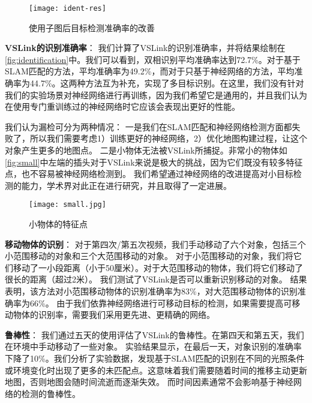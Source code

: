 \begin{figure*}[htbp]
	\centering
	\texttt{[image: ident-res]}
	\caption{使用子图后目标检测准确率的改善}
	\label{fig:identification}
\end{figure*}

\textbf{VSLink的识别准确率}：
我们计算了VSLink的识别准确率，并将结果绘制在\autoref{fig:identification}中。我们可以看到，双相识别平均准确率达到72.7\%。对于基于SLAM匹配的方法，平均准确率为49.2\%，而对于只基于神经网络的方法，平均准确率为44.7\%。这两种方法互为补充，实现了多目标识别。在这里，我们没有针对我们的实验场景对神经网络进行再训练，因为我们希望它是通用的，并且我们认为在使用专门重训练过的神经网络时它应该会表现出更好的性能。

我们认为漏检可分为两种情况：
一是我们在SLAM匹配和神经网络检测方面都失败了，所以我们需要考虑1）训练更好的神经网络，2）优化地图构建过程，让这个对象产生更多的地图点。
二是小物体无法被VSLink所捕捉。非常小的物体如\autoref{fig:small}中左端的插头对于VSLink来说是极大的挑战，因为它们既没有较多特征点，也不容易被神经网络检测到。
我们希望通过神经网络的改进提高对小目标检测的能力，学术界对此正在进行研究，并且取得了一定进展。
\begin{figure}[htbp]
	\centering
	\texttt{[image: small.jpg]}
	\caption{小物体的特征点}
	\label{fig:small}
\end{figure}

\textbf{移动物体的识别}：
对于第四次/第五次视频，我们手动移动了六个对象，包括三个小范围移动的对象和三个大范围移动的对象。
对于小范围移动的对象，我们将它们移动了一小段距离（小于50厘米）。对于大范围移动的物体，我们将它们移动了很长的距离（超过2米）。
我们测试了VSLink是否可以重新识别移动的对象。
结果表明，该方法对小范围移动物体的识别准确率为83\%，对大范围移动物体的识别准确率为66\%。
由于我们依靠神经网络进行可移动目标的检测，如果需要提高可移动物体的识别率，需要我们采用更先进、更精确的网络。


\textbf{鲁棒性}：
我们通过五天的使用评估了VSLink的鲁棒性。在第四天和第五天，我们在环境中手动移动了一些对象。
实验结果显示，在最后一天，对象识别的准确率下降了10\%。我们分析了实验数据，发现基于SLAM匹配的识别在不同的光照条件或环境变化时出现了更多的未匹配点。这意味着我们需要随着时间的推移主动更新地图，否则地图会随时间流逝而逐渐失效。
而时间因素通常不会影响基于神经网络的检测的鲁棒性。



